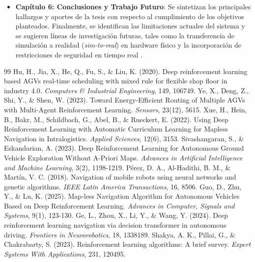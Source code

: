\begin{itemize}
    \item \textbf{Capítulo 6: Conclusiones y Trabajo Futuro}: Se sintetizan los principales hallazgos y aportes de la tesis con respecto al cumplimiento de los objetivos planteados. Finalmente, se identifican las limitaciones actuales del sistema y se sugieren líneas de investigación futuras, tales como la transferencia de simulación a realidad (\textit{sim-to-real}) en hardware físico y la incorporación de restricciones de seguridad en tiempo real \cite{Sivashangaran2023, Xue2022}.
\end{itemize}

\begin{thebibliography}{99}
     Hu, H., Jia, X., He, Q., Fu, S., \& Liu, K. (2020). Deep reinforcement learning based AGVs real-time scheduling with mixed rule for flexible shop floor in industry 4.0. \textit{Computers \& Industrial Engineering}, 149, 106749.
     Ye, X., Deng, Z., Shi, Y., \& Shen, W. (2023). Toward Energy-Efficient Routing of Multiple AGVs with Multi-Agent Reinforcement Learning. \textit{Sensors}, 23(12), 5615.
     Xue, H., Hein, B., Bakr, M., Schildbach, G., Abel, B., \& Rueckert, E. (2022). Using Deep Reinforcement Learning with Automatic Curriculum Learning for Mapless Navigation in Intralogistics. \textit{Applied Sciences}, 12(6), 3153.
     Sivashangaran, S., \& Eskandarian, A. (2023). Deep Reinforcement Learning for Autonomous Ground Vehicle Exploration Without A-Priori Maps. \textit{Advances in Artificial Intelligence and Machine Learning}, 3(2), 1198-1219.
     Pérez, D. A., Al-Hadithi, B. M., \& Martín, V. C. (2018). Navigation of mobile robots using neural networks and genetic algorithms. \textit{IEEE Latin America Transactions}, 16, 8506.
     Guo, D., Zhu, Y., \& Lu, K. (2025). Map-less Navigation Algorithm for Autonomous Vehicles Based on Deep Reinforcement Learning. \textit{Advances in Computer, Signals and Systems}, 9(1), 123-130.
     Ge, L., Zhou, X., Li, Y., \& Wang, Y. (2024). Deep reinforcement learning navigation via decision transformer in autonomous driving. \textit{Frontiers in Neurorobotics}, 18, 1338189.
     Shakya, A. K., Pillai, G., \& Chakrabarty, S. (2023). Reinforcement learning algorithms: A brief survey. \textit{Expert Systems With Applications}, 231, 120495.
\end{thebibliography}